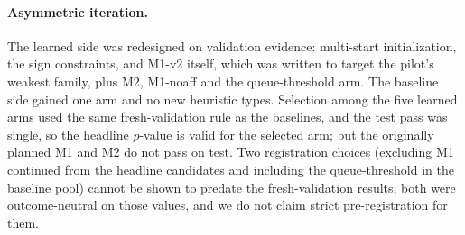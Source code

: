 \paragraph{Asymmetric iteration.}
The learned side was redesigned on validation evidence: multi-start initialization, the sign
constraints, and M1-v2 itself, which was written to target the pilot's weakest family, plus M2,
M1-noaff and the queue-threshold arm. The baseline side gained one arm and no new heuristic types.
Selection among the five learned arms used the same fresh-validation rule as the baselines, and the
test pass was single, so the headline $p$-value is valid for the selected arm; but the originally
planned M1 and M2 do not pass on test. Two registration choices (excluding M1 continued from the
headline candidates and including the queue-threshold  in the baseline pool) cannot be
shown to predate the fresh-validation results; both were outcome-neutral on those values, and we do
not claim strict pre-registration for them.
